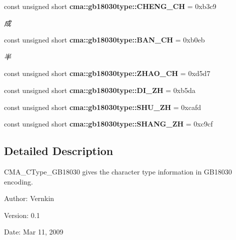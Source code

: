 \begin{CompactItemize}
\item 
const unsigned short {\bf cma::gb18030type::CHENG\_\-CH} = 0xb3c9\label{namespacecma_1_1gb18030type_c031d33ff77a29a5a008e8c80c42ee88}

\begin{CompactList}\small\item\em 成 \item\end{CompactList}\item 
const unsigned short {\bf cma::gb18030type::BAN\_\-CH} = 0xb0eb\label{namespacecma_1_1gb18030type_db33c9ba0b580bdf34bc7b2031a49f64}

\begin{CompactList}\small\item\em 半 \item\end{CompactList}\item 
const unsigned short \textbf{cma::gb18030type::ZHAO\_\-CH} = 0xd5d7\label{namespacecma_1_1gb18030type_cce42ca6a3fe4b4b0ffd3b8a25c00b77}

\item 
const unsigned short \textbf{cma::gb18030type::DI\_\-ZH} = 0xb5da\label{namespacecma_1_1gb18030type_a9e23d9b5d6fe9d1b94531b0fad274f1}

\item 
const unsigned short \textbf{cma::gb18030type::SHU\_\-ZH} = 0xcafd\label{namespacecma_1_1gb18030type_c22b819289c6a7ce1a187928fed53c1d}

\item 
const unsigned short \textbf{cma::gb18030type::SHANG\_\-ZH} = 0xc9cf\label{namespacecma_1_1gb18030type_176dec87e9ab2c45eb44d53efe0cf579}

\end{CompactItemize}


\subsection{Detailed Description}
CMA\_\-CType\_\-GB18030 gives the character type information in GB18030 encoding. 

\begin{Desc}
\item[Author:]Vernkin \end{Desc}
\begin{Desc}
\item[Version:]0.1 \end{Desc}
\begin{Desc}
\item[Date:]Mar 11, 2009 \end{Desc}

